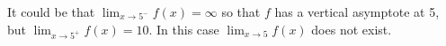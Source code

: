 \documentclass{ximera}
\begin{document}
\begin{exercise}
\begin{exercise}
\begin{exercise}
\begin{exercise}
    				\begin{feedback}
    					It could be that $\displaystyle \lim_{x\to5^-}f(x) = \infty$ so that $f$ has a vertical asymptote at 5, but $\lim_{x\to5^+}f(x)=10$.  In this case $\lim_{x\to5}f(x)$ does not exist.
    				\end{feedback}
    			\end{exercise}
		\end{exercise}
	\end{exercise}
\end{exercise}
\end{document}
